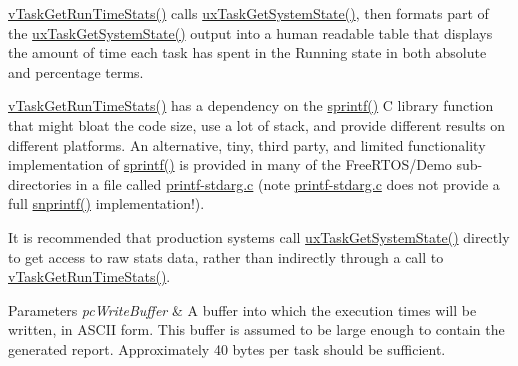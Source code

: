 \hyperlink{task_8h_a52da9b427041a48dc9f6802e10f151d4}{v\-Task\-Get\-Run\-Time\-Stats()} calls \hyperlink{task_8h_aa4603f3de3d809e9beb18d10fbac005d}{ux\-Task\-Get\-System\-State()}, then formats part of the \hyperlink{task_8h_aa4603f3de3d809e9beb18d10fbac005d}{ux\-Task\-Get\-System\-State()} output into a human readable table that displays the amount of time each task has spent in the Running state in both absolute and percentage terms.

\hyperlink{task_8h_a52da9b427041a48dc9f6802e10f151d4}{v\-Task\-Get\-Run\-Time\-Stats()} has a dependency on the \hyperlink{printf-stdarg_8c_aa0649118bc3728b2a62af0b47606ff51}{sprintf()} C library function that might bloat the code size, use a lot of stack, and provide different results on different platforms. An alternative, tiny, third party, and limited functionality implementation of \hyperlink{printf-stdarg_8c_aa0649118bc3728b2a62af0b47606ff51}{sprintf()} is provided in many of the Free\-R\-T\-O\-S/\-Demo sub-\/directories in a file called \hyperlink{printf-stdarg_8c}{printf-\/stdarg.\-c} (note \hyperlink{printf-stdarg_8c}{printf-\/stdarg.\-c} does not provide a full \hyperlink{printf-stdarg_8c_a0b3526078beb75778277d06a066c9508}{snprintf()} implementation!).

It is recommended that production systems call \hyperlink{task_8h_aa4603f3de3d809e9beb18d10fbac005d}{ux\-Task\-Get\-System\-State()} directly to get access to raw stats data, rather than indirectly through a call to \hyperlink{task_8h_a52da9b427041a48dc9f6802e10f151d4}{v\-Task\-Get\-Run\-Time\-Stats()}.


\begin{DoxyParams}{Parameters}
{\em pc\-Write\-Buffer} & A buffer into which the execution times will be written, in A\-S\-C\-I\-I form. This buffer is assumed to be large enough to contain the generated report. Approximately 40 bytes per task should be sufficient. \\
\hline
\end{DoxyParams}
